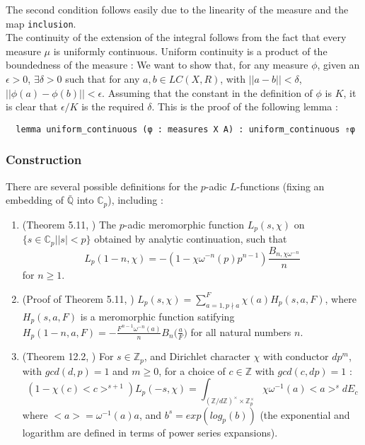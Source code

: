 \documentclass[a4paper,UKenglish,cleveref, autoref, thm-restate]{lipics-v2021}
\newcommand{\lean}[1]{\texttt{#1}\xspace} %
\begin{document}
The second condition follows easily due to the linearity of the measure and the map \lean{inclusion}. \\

The continuity of the extension of the integral follows from the fact that every measure $\mu$ is uniformly continuous. Uniform continuity is a 
product of the boundedness of the measure : We want to show that, for any measure $\phi$, given an $\epsilon > 0$, $\exists \delta > 0$ such that 
for any $a, b \in LC(X, R)$, with $||a - b|| < \delta$, $|| \phi (a) - \phi (b) || < \epsilon$. Assuming that the constant in the definition of $\phi$ 
is $K$, it is clear that $\epsilon / K$ is the required $\delta$. This is the proof of the following lemma :
\begin{lstlisting}
  lemma uniform_continuous (φ : measures X A) : uniform_continuous ⇑φ 
\end{lstlisting}

\subsubsection{Construction}
There are several possible definitions for the $p$-adic $L$-functions (fixing an embedding of
$\mathbb{\bar{\mathbb{Q}}}$ into $\mathbb{C}_p$), including :
\begin{enumerate}{}{}
  \item (Theorem 5.11, \cite{cyc}) The $p$-adic meromorphic function $L_p(s, \chi)$ on
  \newline $\{ s \in \mathbb{C}_p | |s| < p \}$ obtained by analytic continuation, such that
  $$ L_p (1 - n, \chi) = -(1 - \chi \omega^{-n}(p)p^{n - 1}) \frac{B_{n, \chi \omega^{-n}}}{n} $$
  for $n \ge 1$.
  \item (Proof of Theorem 5.11, \cite{cyc})
  $L_p(s, \chi) = \sum_{a = 1, p\nmid a}^F \chi(a)H_p(s, a, F)$, where $H_p (s, a, F)$ is a 
  meromorphic function satifying 
  \newline $H_p(1 - n, a, F) = - \frac{F^{n - 1}\omega^{-n}(a)}{n} B_n \big( \frac{a}{F} \big)$ for all 
  natural numbers $n$.
  \item (Theorem 12.2, \cite{cyc}) For $s \in \mathbb{Z}_p$, and Dirichlet character $\chi$ with
  conductor $d p^m$, with $gcd (d, p) = 1$ and $m \ge 0$, for a choice of $c \in \mathbb{Z}$
  with $gcd (c, dp) = 1$ :
  $$ (1 - \chi(c)<c>^{s+1}) L_p(-s, \chi) = \int_{(\mathbb{Z}/d \mathbb{Z})^{\times} \times \mathbb{Z}_p^{\times}}
  \chi \omega^{-1}(a) <a>^s dE_c $$
  where $<a> = \omega^{-1}(a) a$, and $b^s = exp (log_p (b))$ (the exponential and logarithm are defined in 
  terms of power series expansions).
\end{enumerate}
\end{document}
